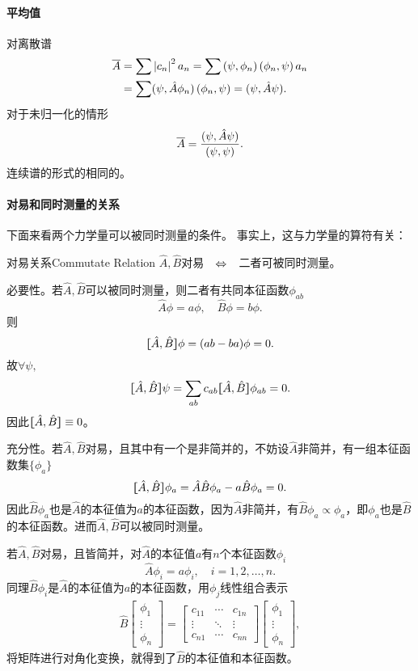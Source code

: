 \paragraph*{平均值}对离散谱
\begin{align}\notag
	\overline A & =\sum\left\lvert c_n\right\rvert^2a_n=\sum\left(\psi,\phi_n\right)\left(\phi_n,\psi\right)a_n  \\
	       & =\sum(\psi,\hat A \phi_n)\left(\phi_n,\psi\right)=(\psi,\hat A\psi).\label{Derivation of Mean Value}
\end{align}
对于未归一化的情形
\[
	\overline A=\frac{(\psi,\hat A\psi)}{(\psi,\psi)}.
\]
连续谱的形式的相同的。
\clearpage
\paragraph*{对易和同时测量的关系}下面来看两个力学量可以被同时测量的条件。
事实上，这与力学量的算符有关：
\begin{theorem}{对易关系}{Commutate Relation}
	\centering $\hat A,\hat B$对易$\quad\Leftrightarrow\quad$二者可被同时测量。
\end{theorem}
\prf 必要性。若$\hat A,\hat B$可以被同时测量，则二者有共同本征函数$\phi_{ab}$
\[
	\hat A\phi=a\phi,\quad \hat B\phi=b\phi.
\]
则
\[
	\lfloor\hspace{-4.7 pt}\lceil \hat A,\hat B\rceil\hspace{-4.7 pt}\rfloor\phi=(ab-ba)\phi=0.
\]
故$\forall\psi,$
\[
	\lfloor\hspace{-4.7 pt}\lceil \hat A,\hat B\rceil\hspace{-4.7 pt}\rfloor\psi=\sum_{ab}c_{ab}\lfloor\hspace{-4.7 pt}\lceil \hat A,\hat B\rceil\hspace{-4.7 pt}\rfloor\phi_{ab}=0.
\]
因此$\lfloor\hspace{-4.7 pt}\lceil \hat A,\hat B\rceil\hspace{-4.7 pt}\rfloor\equiv 0$。

充分性。若$\hat A,\hat B$对易，且其中有一个是非简并的，不妨设$\hat A$非简并，有一组本征函数集$\{\phi_a\}$
\[
	\lfloor\hspace{-4.7 pt}\lceil \hat A,\hat B\rceil\hspace{-4.7 pt}\rfloor\phi_a=\hat A\hat B\phi_a-a\hat B\phi_a=0.
\]
因此$\hat B\phi_a$也是$\hat A$的本征值为$a$的本征函数，因为$\hat A$非简并，有$\hat B\phi_a\propto\phi_a$，即$\phi_a$也是$\hat B$的本征函数。进而$\hat A,\hat B$可以被同时测量。

若$\hat A,\hat B$对易，且皆简并，对$\hat A$的本征值$a$有$n$个本征函数$\phi_i$
\[
	\hat A\phi_i=a\phi_i,\quad i=1,2,\ldots,n.
\]
同理$\hat B\phi_i$是$\hat A$的本征值为$a$的本征函数，用$\phi_j$线性组合表示
\begin{align*}
	\hat B\begin{bmatrix}
		\phi_1 \\\vdots\\\phi_n
	\end{bmatrix}=\begin{bmatrix}
		c_{11} & \cdots & c_{1n} \\
		\vdots & \ddots & \vdots \\
		c_{n1} & \cdots & c_{nn}
	\end{bmatrix}\begin{bmatrix}
		\phi_1 \\\vdots\\\phi_n
	\end{bmatrix},
\end{align*}
将矩阵进行对角化变换，就得到了$\hat B$的本征值和本征函数。
